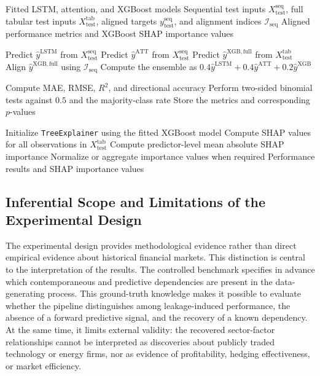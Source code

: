 \documentclass[utf8]{FrontiersinHarvard} %
\begin{document}
\begin{algorithm}[h]
	\caption{Aligned model evaluation and XGBoost SHAP analysis.}
	\label{alg:evaluation_shap}
	\begin{algorithmic}[1]
		\REQUIRE Fitted LSTM, attention, and XGBoost models
		\REQUIRE Sequential test inputs \(X_{\mathrm{test}}^{\mathrm{seq}}\), full tabular test inputs \(X_{\mathrm{test}}^{\mathrm{tab}}\), aligned targets \(y_{\mathrm{test}}^{\mathrm{seq}}\), and alignment indices \(\mathcal{I}_{\mathrm{seq}}\)
		\ENSURE Aligned performance metrics and XGBoost SHAP importance values
		
		\STATE Predict \(\hat{y}^{\mathrm{LSTM}}\) from \(X_{\mathrm{test}}^{\mathrm{seq}}\)
		\STATE Predict \(\hat{y}^{\mathrm{ATT}}\) from \(X_{\mathrm{test}}^{\mathrm{seq}}\)
		\STATE Predict \(\hat{y}^{\mathrm{XGB,full}}\) from \(X_{\mathrm{test}}^{\mathrm{tab}}\)
		\STATE Align \(\hat{y}^{\mathrm{XGB,full}}\) using \(\mathcal{I}_{\mathrm{seq}}\)
		\STATE Compute the ensemble as \(0.4\hat{y}^{\mathrm{LSTM}}+0.4\hat{y}^{\mathrm{ATT}}+0.2\hat{y}^{\mathrm{XGB}}\)
		
		\STATE Compute MAE, RMSE, \(R^2\), and directional accuracy
		\STATE Perform two-sided binomial tests against \(0.5\) and the majority-class rate
		\STATE Store the metrics and corresponding \(p\)-values
		\ENDFOR
		
		\STATE Initialize \texttt{TreeExplainer} using the fitted XGBoost model
		\STATE Compute SHAP values for all observations in \(X_{\mathrm{test}}^{\mathrm{tab}}\)
		\STATE Compute predictor-level mean absolute SHAP importance
		\STATE Normalize or aggregate importance values when required
		\RETURN Performance results and SHAP importance values
	\end{algorithmic}
\end{algorithm}

\subsection{Inferential Scope and Limitations of the Experimental Design}
\label{subsec:inferential_scope}

The experimental design provides methodological evidence rather than direct empirical evidence about historical financial markets. This distinction is central to the interpretation of the results. The controlled benchmark specifies in advance which contemporaneous and predictive dependencies are present in the data-generating process. This ground-truth knowledge makes it possible to evaluate whether the pipeline distinguishes among leakage-induced performance, the absence of a forward predictive signal, and the recovery of a known dependency. At the same time, it limits external validity: the recovered sector-factor relationships cannot be interpreted as discoveries about publicly traded technology or energy firms, nor as evidence of profitability, hedging effectiveness, or market efficiency.
\end{document}
